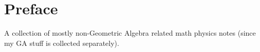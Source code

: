 \chapter{Preface}

A collection of mostly non-Geometric Algebra related math physics notes (since my GA stuff is collected separately).

